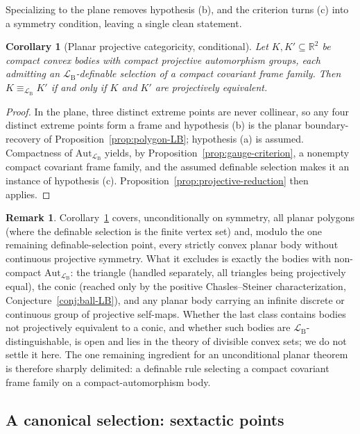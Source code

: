 \documentclass[11pt]{amsart}
\newtheorem{corollary}[theorem]{Corollary}
\theoremstyle{definition}
\newtheorem{remark}[theorem]{Remark}
\newcommand{\R}{\mathbb{R}}
\newcommand{\LB}{\mathcal{L}_{\mathrm{B}}}
\begin{document}
Specializing to the plane removes hypothesis (b), and the criterion turns (c)
into a symmetry condition, leaving a single clean statement.

\begin{corollary}[Planar projective categoricity, conditional]
\label{cor:planar-projective}
Let $K,K'\subseteq\R^2$ be compact convex
bodies with compact projective automorphism groups, each admitting an
$\LB$-definable selection of a compact covariant frame family. Then
$K\equiv_{\LB}K'$ if and only if $K$ and $K'$ are projectively equivalent.
\end{corollary}

\begin{proof}
In the plane, three distinct extreme points are never collinear, so any four
distinct extreme points form a frame and hypothesis (b) is the planar
boundary-recovery of Proposition~\ref{prop:polygon-LB}; hypothesis (a) is
assumed. Compactness of $\mathrm{Aut}_{\LB}$ yields, by
Proposition~\ref{prop:gauge-criterion}, a nonempty compact covariant frame
family, and the assumed definable selection makes it an instance of hypothesis
(c). Proposition~\ref{prop:projective-reduction} then applies.
\end{proof}

\begin{remark}
Corollary~\ref{cor:planar-projective} covers, unconditionally on symmetry, all
planar polygons (where the definable selection is the finite vertex set) and,
modulo the one remaining definable-selection point, every strictly convex
planar body without continuous projective symmetry. What it excludes is exactly
the bodies with non-compact $\mathrm{Aut}_{\LB}$: the triangle (handled
separately, all triangles being projectively equal), the conic (reached only by
the positive Chasles--Steiner characterization, Conjecture~\ref{conj:ball-LB}),
and any planar body carrying an infinite discrete or continuous group of
projective self-maps. Whether the last class contains bodies not projectively
equivalent to a conic, and whether such bodies are $\LB$-distinguishable, is
open and lies in the theory of divisible convex sets; we do not settle it here.
The one remaining ingredient for an unconditional planar theorem is therefore
sharply delimited: a definable rule selecting a compact covariant frame
family on a compact-automorphism body.
\end{remark}

\subsection{A canonical selection: sextactic points}\label{subsec:sextactic}
\end{document}
